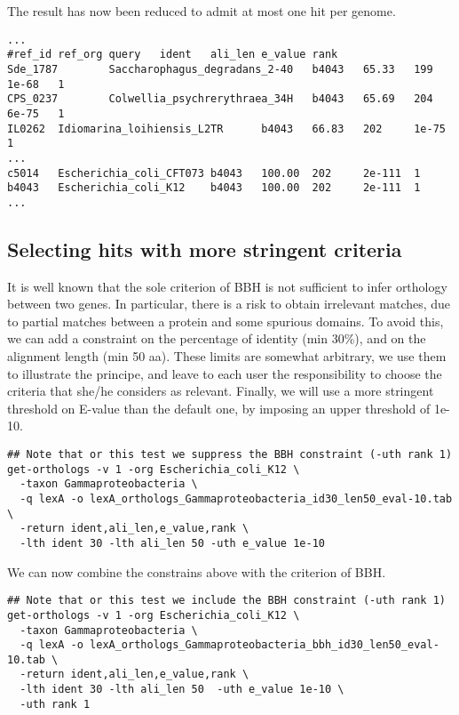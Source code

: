 The result has now been reduced to admit at most one hit per genome.

\begin{scriptsize}
\begin{verbatim}
...
#ref_id ref_org query   ident   ali_len e_value rank
Sde_1787        Saccharophagus_degradans_2-40   b4043   65.33   199     1e-68   1
CPS_0237        Colwellia_psychrerythraea_34H   b4043   65.69   204     6e-75   1
IL0262  Idiomarina_loihiensis_L2TR      b4043   66.83   202     1e-75   1
...
c5014   Escherichia_coli_CFT073 b4043   100.00  202     2e-111  1
b4043   Escherichia_coli_K12    b4043   100.00  202     2e-111  1
...
\end{verbatim}
\end{scriptsize}

\subsection{Selecting hits with more stringent criteria}

It is well known that the sole criterion of BBH is not sufficient to
infer orthology between two genes. In particular, there is a risk to
obtain irrelevant matches, due to partial matches between a protein
and some spurious domains. To avoid this, we can add a constraint on
the percentage of identity (min 30\%), and on the alignment length
(min 50 aa). These limits are somewhat arbitrary, we use them to
illustrate the principe, and leave to each user the responsibility to
choose the criteria that she/he considers as relevant. Finally, we
will use a more stringent threshold on E-value than the default one,
by imposing an upper threshold of 1e-10.

\begin{small}
\begin{verbatim}
## Note that or this test we suppress the BBH constraint (-uth rank 1)
get-orthologs -v 1 -org Escherichia_coli_K12 \
  -taxon Gammaproteobacteria \
  -q lexA -o lexA_orthologs_Gammaproteobacteria_id30_len50_eval-10.tab \
  -return ident,ali_len,e_value,rank \
  -lth ident 30 -lth ali_len 50 -uth e_value 1e-10
\end{verbatim}
\end{small}

We can now combine the constrains above with the criterion of BBH.

\begin{small}
\begin{verbatim}
## Note that or this test we include the BBH constraint (-uth rank 1)
get-orthologs -v 1 -org Escherichia_coli_K12 \
  -taxon Gammaproteobacteria \
  -q lexA -o lexA_orthologs_Gammaproteobacteria_bbh_id30_len50_eval-10.tab \
  -return ident,ali_len,e_value,rank \
  -lth ident 30 -lth ali_len 50  -uth e_value 1e-10 \
  -uth rank 1 
\end{verbatim}
\end{small}

